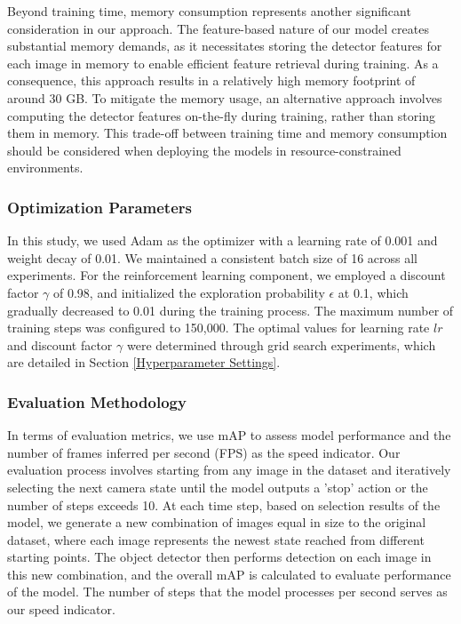 \documentclass[lettersize,journal]{IEEEtran}
\begin{document}
Beyond training time, memory consumption represents another significant consideration in our approach.  The feature-based nature of our model creates substantial memory demands, as it necessitates storing the detector features for each image in memory to enable efficient feature retrieval during training.  As a consequence, this approach results in a relatively high memory footprint of around 30 GB.
To mitigate the memory usage, an alternative approach involves computing the detector features on-the-fly during training, rather than storing them in memory.  This trade-off between training time and memory consumption should be considered when deploying the models in resource-constrained environments.

\subsubsection{Optimization Parameters}
In this study, we used Adam as the optimizer with a learning rate of 0.001 and weight decay of 0.01. We maintained a consistent batch size of 16 across all experiments. For the reinforcement learning component, we employed a discount factor $\gamma$ of 0.98, and initialized the exploration probability $\epsilon$ at 0.1, which gradually decreased to 0.01 during the training process. The maximum number of training steps was configured to 150,000. The optimal values for learning rate $lr$ and discount factor $\gamma$ were determined through grid search experiments, which are detailed in Section \ref{Hyperparameter Settings}.

\subsubsection{Evaluation Methodology}
In terms of evaluation metrics, we use mAP to assess model performance and the number of frames inferred per second (FPS) as the speed indicator.  Our evaluation process involves starting from any image in the dataset and iteratively selecting the next camera state until the model outputs a 'stop' action or the number of steps exceeds 10. At each time step, based on selection results of the model, we generate a new combination of images equal in size to the original dataset, where each image represents the newest state reached from different starting points. The object detector then performs detection on each image in this new combination, and the overall mAP is calculated to evaluate performance of the model.  The number of steps that the model processes per second serves as our speed indicator.
\end{document}
